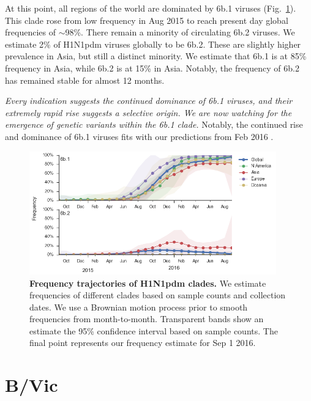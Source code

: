 \documentclass[11pt,oneside,letterpaper]{article}
\begin{document}
\pagebreak

At this point, all regions of the world are dominated by 6b.1 viruses (Fig.\ \ref{H1N1pdm_clades}). This clade rose from low frequency in Aug 2015 to reach present day global frequencies of $\sim$98\%. There remain a minority of circulating 6b.2 viruses. We estimate 2\% of H1N1pdm viruses globally to be 6b.2. These are slightly higher prevalence in Asia, but still a distinct minority. We estimate that 6b.1 is at 85\% frequency in Asia, while 6b.2 is at 15\% in Asia. Notably, the frequency of 6b.2 has remained stable for almost 12 months.

\textit{Every indication suggests the continued dominance of 6b.1 viruses, and their extremely rapid rise suggests a selective origin. We are now watching for the emergence of genetic variants within the 6b.1 clade.} Notably, the continued rise and dominance of 6b.1 viruses fits with our predictions from Feb 2016 \cite{feb2016report}.

\begin{figure}[H]
	\centering
	\includegraphics[width=0.95\textwidth]{../figures/sep-2016/H1N1pdm_clades.png}
	\caption{\textbf{Frequency trajectories of H1N1pdm clades.}
	We estimate frequencies of different clades based on sample counts and collection dates.
	We use a Brownian motion process prior to smooth frequencies from month-to-month.
	Transparent bands show an estimate the 95\% confidence interval based on sample counts.
	The final point represents our frequency estimate for Sep 1 2016.
	}
	\label{H1N1pdm_clades}
\end{figure}

\clearpage
\pagebreak

\section*{B/Vic}
\end{document}
